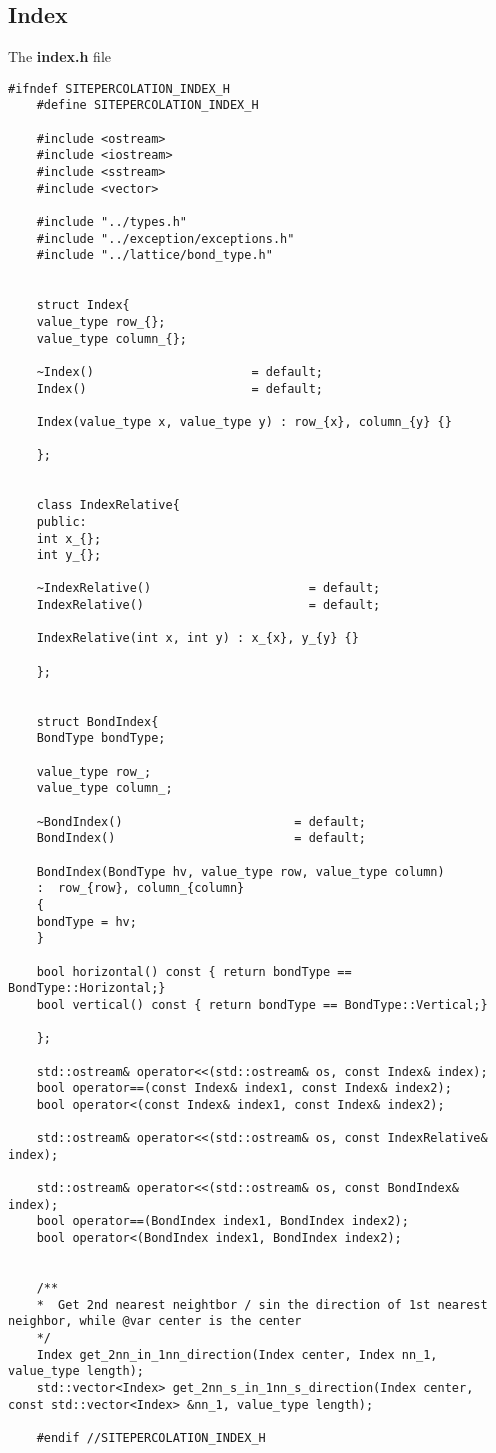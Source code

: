 	\subsection{Index}
	The \textbf{index.h} file
	\begin{lstlisting}[style=CStyle]
	#ifndef SITEPERCOLATION_INDEX_H
	#define SITEPERCOLATION_INDEX_H
	
	#include <ostream>
	#include <iostream>
	#include <sstream>
	#include <vector>
	
	#include "../types.h"
	#include "../exception/exceptions.h"
	#include "../lattice/bond_type.h"
	
	
	struct Index{
	value_type row_{};
	value_type column_{};
	
	~Index()                      = default;
	Index()                       = default;
		
	Index(value_type x, value_type y) : row_{x}, column_{y} {}
	
	};
	
	
	class IndexRelative{
	public:
	int x_{};
	int y_{};
	
	~IndexRelative()                      = default;
	IndexRelative()                       = default;
	
	IndexRelative(int x, int y) : x_{x}, y_{y} {}
	
	};
	

	struct BondIndex{
	BondType bondType;
	
	value_type row_;
	value_type column_;
	
	~BondIndex()                        = default;
	BondIndex()                         = default;
	
	BondIndex(BondType hv, value_type row, value_type column)
	:  row_{row}, column_{column}
	{
	bondType = hv;
	}
	
	bool horizontal() const { return bondType == BondType::Horizontal;}
	bool vertical() const { return bondType == BondType::Vertical;}
	
	};
	
	std::ostream& operator<<(std::ostream& os, const Index& index);
	bool operator==(const Index& index1, const Index& index2);
	bool operator<(const Index& index1, const Index& index2);
	
	std::ostream& operator<<(std::ostream& os, const IndexRelative& index);
	
	std::ostream& operator<<(std::ostream& os, const BondIndex& index);
	bool operator==(BondIndex index1, BondIndex index2);
	bool operator<(BondIndex index1, BondIndex index2);
	
	
	/**
	*  Get 2nd nearest neightbor / sin the direction of 1st nearest neighbor, while @var center is the center
	*/
	Index get_2nn_in_1nn_direction(Index center, Index nn_1, value_type length);
	std::vector<Index> get_2nn_s_in_1nn_s_direction(Index center, const std::vector<Index> &nn_1, value_type length);
	
	#endif //SITEPERCOLATION_INDEX_H
	
	\end{lstlisting}
	
